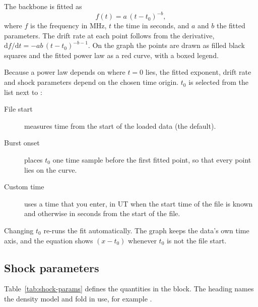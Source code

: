 The backbone is fitted as
\begin{equation}
  f(t) = a\,(t - t_0)^{-b},
  \label{eq:power-law}
\end{equation}
where \(f\) is the frequency in MHz, \(t\) the time in seconds, and \(a\) and \(b\) the fitted
parameters. The drift rate at each point follows from the derivative,
\(\mathrm{d}f/\mathrm{d}t = -ab\,(t-t_0)^{-b-1}\). On the  graph the points are
drawn as filled black squares and the fitted power law as a red curve, with a boxed legend.

Because a power law depends on where \(t=0\) lies, the fitted exponent, drift rate and shock
parameters depend on the chosen time origin. \(t_0\) is selected from the  list next
to :
\begin{description}
  \item[File start] measures time from the start of the loaded data (the default).
  \item[Burst onset] places \(t_0\) one time sample before the first fitted point, so that
    every point lies on the curve.
  \item[Custom time] uses a time that you enter, in UT when the start time of the file is
    known and otherwise in seconds from the start of the file.
\end{description}
Changing \(t_0\) re-runs the fit automatically. The graph keeps the data's own time axis,
and the equation shows \((x - t_0)\) whenever \(t_0\) is not the file start.

\subsection{Shock parameters}

Table~\ref{tab:shock-params} defines the quantities in the  block. The
heading names the density model and fold in use, for example
.

